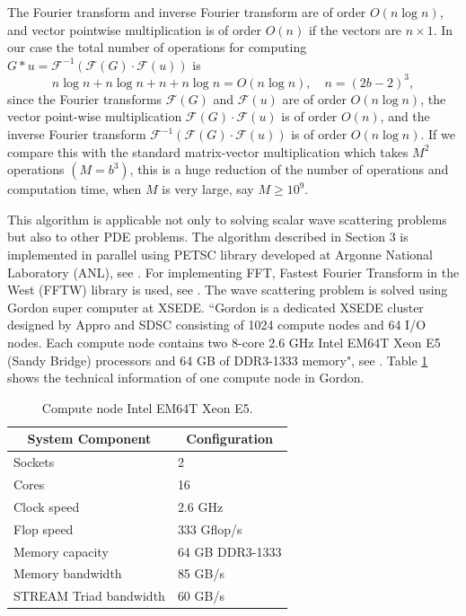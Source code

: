 \documentclass{wap}
\makeatletter
\let\sectionorig\section
\def\@sectionorig#1{\sectionorig*{\MakeUppercase{#1}}}
\def\@@sectionorig#1{\sectionorig{\MakeUppercase{#1}}}
\renewcommand{\section}{\@ifstar{\@sectionorig}{\@@sectionorig}}
\newcommand{\be}{\begin{equation}}
\newcommand{\ee}{\end{equation}}
\makeatother
\begin{document}
The Fourier transform and inverse Fourier transform are of order $O(n\log n)$, and vector pointwise multiplication is of order $O(n)$ if the vectors are $n \times 1$. In our case the total number of operations for computing $G*u=\mathcal{F}^{-1}(\mathcal{F}(G)\cdot \mathcal{F}(u))$ is
\be \label{eq3.3.9}
	n\log n+n\log n+n+n\log n=O(n\log n), \quad n=(2b-2)^3,
\ee
since the Fourier transforms $\mathcal{F}(G)$ and $\mathcal{F}(u)$ are of order $O(n\log n)$, the vector point-wise multiplication  $\mathcal{F}(G)\cdot \mathcal{F}(u)$ is of order $O(n)$, and the inverse Fourier transform $\mathcal{F}^{-1}(\mathcal{F}(G)\cdot \mathcal{F}(u))$ is of order $O(n\log n)$.
If we compare this with the standard matrix-vector multiplication which takes $M^2$ operations $(M=b^3)$, this is a huge reduction of the number of operations and computation time, when $M$ is very large, say $M \ge 10^{9}$.

This algorithm is applicable not only to solving scalar wave scattering problems but also to other PDE problems.\vspace{0.6em}
\section{\textsc{NUMERICAL EXAMPLES}}
\hspace*{\parindent}The algorithm described in Section 3 is implemented in parallel using PETSC library developed at Argonne National Laboratory (ANL), see \cite{Petsc}. For implementing FFT, Fastest Fourier Transform in the West (FFTW) library is used, see \cite{FFTW}. The wave scattering problem is solved using Gordon super computer at XSEDE. ``Gordon is a dedicated XSEDE cluster designed by Appro and SDSC consisting of 1024 compute nodes and 64 I/O nodes. Each compute node contains two 8-core 2.6 GHz Intel EM64T Xeon E5 (Sandy Bridge) processors and 64 GB of DDR3-1333 memory", see \cite{Gordon}. Table \ref{tab1} shows the technical information of one compute node in Gordon.
\begin{table}[!hbp]
  \centering
  \caption{Compute node Intel EM64T Xeon E5.}
    \begin{tabular}{rr}
    \toprule
    \multicolumn{1}{c}{System Component} & \multicolumn{1}{c}{Configuration} \\
    \midrule
    \multicolumn{1}{l}{Sockets} & \multicolumn{1}{l}{2} \\
    \multicolumn{1}{l}{Cores} & \multicolumn{1}{l}{16} \\
    \multicolumn{1}{l}{Clock speed} & \multicolumn{1}{l}{2.6 GHz} \\
    \multicolumn{1}{l}{Flop speed} & \multicolumn{1}{l}{333 Gflop/s} \\
    \multicolumn{1}{l}{Memory capacity} & \multicolumn{1}{l}{64 GB DDR3-1333} \\
    \multicolumn{1}{l}{Memory bandwidth} & \multicolumn{1}{l}{85 GB/s} \\
    \multicolumn{1}{l}{STREAM Triad bandwidth} & \multicolumn{1}{l}{60 GB/s} \\
    \bottomrule
    \end{tabular}%
  \label{tab1}%
\end{table}%
\end{document}

